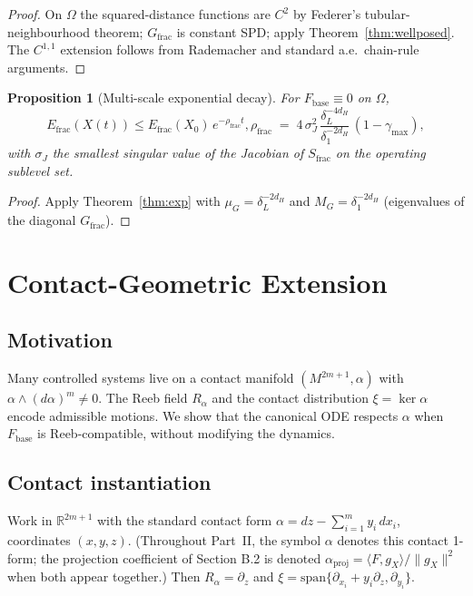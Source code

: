 \documentclass[11pt,oneside]{amsart}
\def\S{Section }%
\def\qquad{ }%
\theoremstyle{plain}
\newtheorem{proposition}[theorem]{Proposition}
\theoremstyle{definition}
\newcommand{\gX}{g_X}
\newcommand{\Fbase}{F_{\mathrm{base}}}
\newcommand{\R}{\mathbb{R}}
\begin{document}
\begin{proof}
On $\Omega$ the squared-distance functions are $C^{2}$ by Federer's
tubular-neighbourhood theorem; $G_{\mathrm{frac}}$ is constant SPD;
apply Theorem~\ref{thm:wellposed}. The $C^{1,1}$ extension follows
from Rademacher and standard a.e.\ chain-rule arguments.
\end{proof}

\begin{proposition}[Multi-scale exponential decay]
\label{prop:multi-scale-decay}
For $\Fbase\equiv 0$ on $\Omega$,
\[
  E_{\mathrm{frac}}(X(t)) \le E_{\mathrm{frac}}(X_{0})\,e^{-\rho_{\mathrm{frac}}t},
  \qquad
  \rho_{\mathrm{frac}} \;=\; 4\,\sigma_{J}^{2}\,
         \frac{\delta_{L}^{-4 d_{H}}}{\delta_{1}^{-2 d_{H}}}
         \,(1-\gamma_{\max}),
\]
with $\sigma_{J}$ the smallest singular value of the Jacobian of
$S_{\mathrm{frac}}$ on the operating sublevel set.
\end{proposition}

\begin{proof}
Apply Theorem~\ref{thm:exp} with $\mu_{G}=\delta_{L}^{-2 d_{H}}$ and
$M_{G}=\delta_{1}^{-2 d_{H}}$ (eigenvalues of the diagonal
$G_{\mathrm{frac}}$).
\end{proof}

\section{Contact-Geometric Extension}
\label{sec:contact}

\subsection{Motivation}

Many controlled systems live on a contact manifold $(M^{2m+1},\alpha)$
with $\alpha\wedge(d\alpha)^{m}\neq 0$. The Reeb field $R_{\alpha}$ and
the contact distribution $\xi=\ker\alpha$ encode admissible motions.
We show that the canonical ODE respects $\alpha$ when $\Fbase$ is
Reeb-compatible, without modifying the dynamics.

\subsection{Contact instantiation}

Work in $\R^{2m+1}$ with the standard contact form
$\alpha = dz - \sum_{i=1}^{m} y_{i}\,dx_{i}$, coordinates
$(x,y,z)$. (Throughout Part~II, the symbol $\alpha$ denotes this
contact 1-form; the projection coefficient of \S B.2 is denoted
$\alpha_{\mathrm{proj}}=\langle F,\gX\rangle/\|\gX\|^{2}$ when both
appear together.) Then $R_{\alpha}=\partial_{z}$ and
$\xi=\mathrm{span}\{\partial_{x_{i}}+y_{i}\partial_{z},\partial_{y_{i}}\}$.
\end{document}
